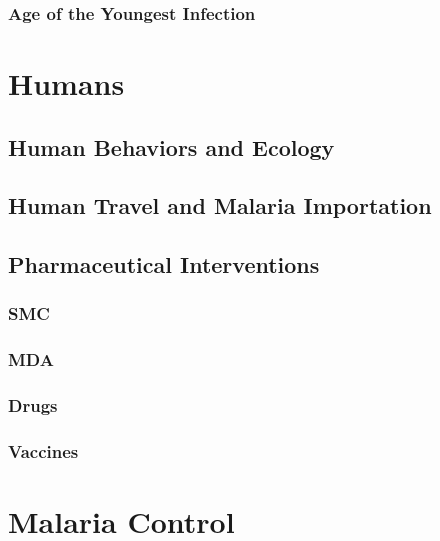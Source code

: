 \documentclass[
]{book}
\begin{document}
\hypertarget{age-of-the-youngest-infection}{%
\section{Age of the Youngest Infection}\label{age-of-the-youngest-infection}}

\hypertarget{part-humans}{%
\part{Humans}\label{part-humans}}

\hypertarget{human-behaviors-and-ecology}{%
\chapter{Human Behaviors and Ecology}\label{human-behaviors-and-ecology}}

\hypertarget{human-travel-and-malaria-importation}{%
\chapter{Human Travel and Malaria Importation}\label{human-travel-and-malaria-importation}}

\hypertarget{pharmaceutical-interventions}{%
\chapter{Pharmaceutical Interventions}\label{pharmaceutical-interventions}}

\hypertarget{smc}{%
\section{SMC}\label{smc}}

\hypertarget{mda}{%
\section{MDA}\label{mda}}

\hypertarget{drugs}{%
\section{Drugs}\label{drugs}}

\hypertarget{vaccines}{%
\section{Vaccines}\label{vaccines}}

\hypertarget{part-malaria-control}{%
\part{Malaria Control}\label{part-malaria-control}}
\end{document}
